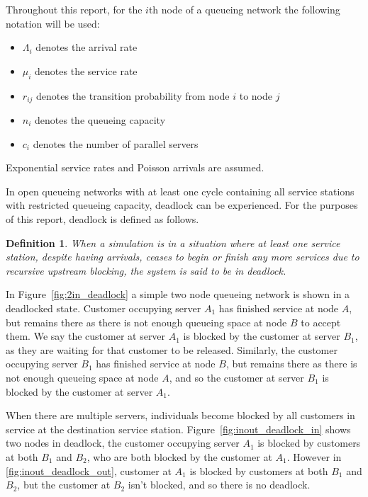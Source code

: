 \documentclass{article}
\newtheorem{definition}{Definition}
\begin{document}
Throughout this report, for the $i$th node of a queueing network the following notation will be used:

\begin{itemize}
  \item $\Lambda_i$ denotes the arrival rate
  \item $\mu_i$ denotes the service rate
  \item $r_{ij}$ denotes the transition probability from node $i$ to node $j$
  \item $n_i$ denotes the queueing capacity
  \item $c_i$ denotes the number of parallel servers
\end{itemize}

Exponential service rates and Poisson arrivals are assumed.

In open queueing networks with at least one cycle containing all service stations with restricted queueing capacity, deadlock can be experienced.
For the purposes of this report, deadlock is defined as follows.\\

\begin{definition}
    When a simulation is in a situation where at least one service station,
    despite having arrivals, ceases to begin or finish any more services
    due to recursive upstream blocking, the system is said to be in deadlock.
\end{definition}

In Figure~\ref{fig:2in_deadlock} a simple two node queueing network is shown in a deadlocked state.
Customer occupying server $A_1$ has finished service at node $A$, but remains there as there is not
enough queueing space at node $B$ to accept them.
We say the customer at server $A_1$ is blocked by the customer at server $B_1$, as they are waiting for that customer to be released.
Similarly, the customer occupying server $B_1$ has finished service at node $B$, but remains there as there is not enough queueing space at node $A$, and so the customer at server $B_1$ is blocked by the customer at server $A_1$.

When there are multiple servers, individuals become blocked by all customers in
service at the destination service station.
Figure~\ref{fig:inout_deadlock_in} shows two nodes in deadlock, the customer occupying server $A_1$ is blocked by customers at both $B_1$ and $B_2$, who are both blocked by the customer at $A_1$.
However in \ref{fig:inout_deadlock_out}, customer at $A_1$ is blocked by customers at both $B_1$ and $B_2$, but the customer at $B_2$ isn't blocked, and so there is no deadlock.
\end{document}
